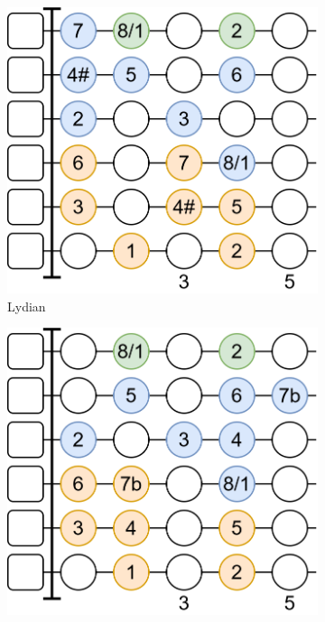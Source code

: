 \begin{figure}[h]
	\begin{subfigure}[b]{0.31\textwidth}
		\centering
		\includegraphics[height=0.175\textheight]{../../Images/LydianScaleShape.png}
		\caption{Lydian}
		\label{fig:guitar_mode_shape_lydian}
	\end{subfigure}
	\hfill
	\begin{subfigure}[b]{0.31\textwidth}
		\centering
		\includegraphics[height=0.175\textheight]{../../Images/MixolydianScaleShape.png}

\end{subfigure}
\end{figure}
